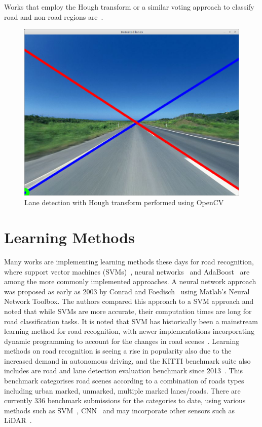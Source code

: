 Works that employ the Hough transform or a similar voting approach to classify road and non-road regions are~\cite{h._kong_general_2010, abbas_novel_2016, zhu_visual_2014}.

\begin{figure}[H]
	\centering
	\includegraphics[width=0.5\linewidth]{lane_detection.png}
	\caption{\label{fig:lanedetect}Lane detection with Hough transform performed using OpenCV}
\end{figure}

\section{Learning Methods} \label{seclearning}
Many works are implementing learning methods these days for road recognition, where support vector machines (SVMs)~\cite{shengyan_self-supervised_2010,jian_unstructured_2009}, neural networks~\cite{m._foedisch_adaptive_2004} and AdaBoost~\cite{cord_automatic_2012} are among the more commonly implemented approaches. A neural network approach was proposed as early as 2003 by Conrad and Foedisch~\cite{p._conrad_performance_2003} using Matlab's Neural Network Toolbox. The authors compared this approach to a SVM approach and noted that while SVMs are more accurate, their computation times are long for road classification tasks. It is noted that SVM has historically been a mainstream learning method for road recognition, with newer implementations incorporating dynamic programming to account for the changes in road scenes~\cite{j._yao_estimating_2015}. Learning methods on road recognition is seeing a rise in popularity also due to the increased demand in autonomous driving, and the KITTI benchmark suite also includes are road and lane detection evaluation benchmark since 2013~\cite{jannik_fritsch_new_2013}. This benchmark categorises road scenes according to a combination of roads types including urban marked, unmarked, multiple marked lanes/roads. There are currently 336 benchmark submissions for the categories to date, using various methods such as SVM~\cite{d._a._chacra_road_2016}, CNN~\cite{oliveira_efficient_2016,mendes_exploiting_2016} and may incorporate other sensors such as LiDAR~\cite{caltagirone_fast_2017}.

